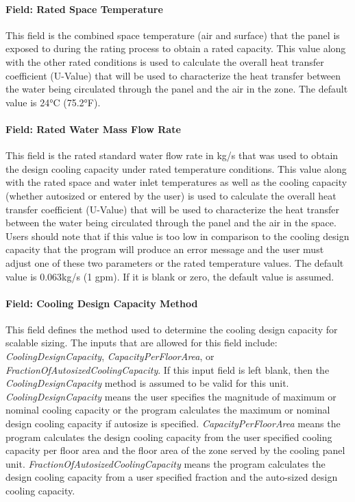 \paragraph{Field: Rated Space Temperature}\label{field-rated-space-temperature}

This field is the combined space temperature (air and surface) that the panel is exposed to during the rating process to obtain a rated capacity.  This value along with the other rated conditions is used to calculate the overall heat transfer coefficient (U-Value) that will be used to characterize the heat transfer between the water being circulated through the panel and the air in the zone.  The default value is 24°C (75.2°F).

\paragraph{Field: Rated Water Mass Flow Rate}\label{field-rated-water-mass-flow-rate}

This field is the rated standard water flow rate in kg/s that was used to obtain the design cooling capacity under rated temperature conditions.  This value along with the rated space and water inlet temperatures as well as the cooling capacity (whether autosized or entered by the user) is used to calculate the overall heat transfer coefficient (U-Value) that will be used to characterize the heat transfer between the water being circulated through the panel and the air in the space.  Users should note that if this value is too low in comparison to the cooling design capacity that the program will produce an error message and the user must adjust one of these two parameters or the rated temperature values.  The default value is 0.063kg/s (1 gpm).  If it is blank or zero, the default value is assumed.

\paragraph{Field: Cooling Design Capacity Method}\label{field-cooling-design-capacity-method-2}

This field defines the method used to determine the cooling design capacity for scalable sizing. The inputs that are allowed for this field include: \emph{CoolingDesignCapacity}, \emph{CapacityPerFloorArea}, or \emph{FractionOfAutosizedCoolingCapacity}. If this input field is left blank, then the \emph{CoolingDesignCapacity} method is assumed to be valid for this unit. \emph{CoolingDesignCapacity} means the user specifies the magnitude of maximum or nominal cooling capacity or the program calculates the maximum or nominal design cooling capacity if autosize is specified. \emph{CapacityPerFloorArea} means the program calculates the design cooling capacity from the user specified cooling capacity per floor area and the floor area of the zone served by the cooling panel unit. \emph{FractionOfAutosizedCoolingCapacity} means the program calculates the design cooling capacity from a user specified fraction and the auto-sized design cooling capacity.


